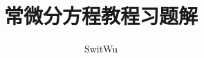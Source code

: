 \documentclass[fontset=fandol]{ctexrep}
\begin{document}
\title{常微分方程教程习题解}
\author{SwitWu}
\maketitle

\tableofcontents
\cleardoublepage

\setcounter{page}{1}







\end{document}
